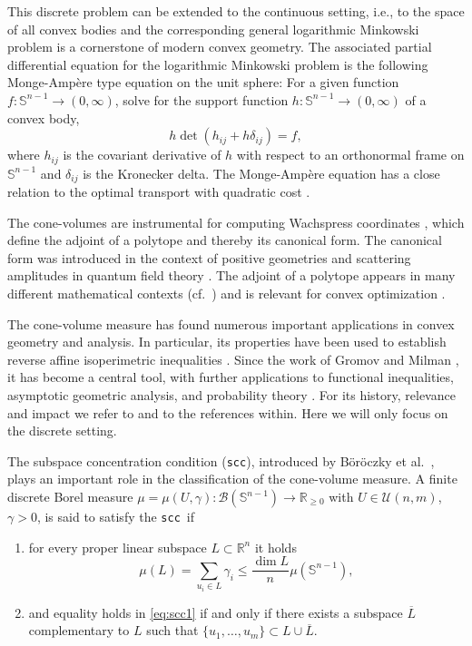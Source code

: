 \documentclass[11pt, a4paper, twoside, reqno]{amsart}
\newcommand{\R}{\mathbb{R}}
\theoremstyle{definition}
\theoremstyle{remark}
\newcommand{\sph}{\mathbb{S}}%
\newcommand{\scc}{{\tt scc}}
\newcommand{\ov}{\overline}
\numberwithin{equation}{section}
\begin{document}
This discrete problem can be extended to the continuous setting, i.e., to the space of all convex bodies and  
the corresponding general logarithmic Minkowski problem is a cornerstone of modern convex geometry. 
The associated partial differential equation for the logarithmic Minkowski problem is the following Monge-Ampère type equation on the unit sphere: For a given function $f: \sph^{n-1} \rightarrow (0,\infty)$, solve for the support function $h: \sph^{n-1} \rightarrow (0,\infty)$ of a convex body,
\begin{equation*}
    h \det(h_{ij} + h \delta_{ij}) = f,
\end{equation*}
where $h_{ij}$ is the covariant derivative of $h$ with respect to an orthonormal frame on $\sph^{n-1}$ and $\delta_{ij}$ is the Kronecker delta. The Monge-Ampère equation has a close relation to the optimal transport with quadratic cost \cite{de2014monge}. 

The cone-volumes are instrumental for computing Wachspress coordinates \cite{ju2005geometric}, which define the adjoint of a polytope and thereby its canonical form. The canonical form was introduced in the context of positive geometries and scattering amplitudes in quantum field theory \cite{arkani2017positive}. The adjoint of a polytope appears in many different mathematical contexts (cf.~\cite{kohn2020projective}) and is relevant for convex optimization \cite{Dmitrii2025}.

The cone-volume measure has found numerous important applications in convex geometry and analysis.
In particular, its properties have been used to establish reverse affine isoperimetric inequalities 
\cite{HE200673,XIONG20103214}. Since the work of Gromov and Milman 
\cite{CM_1987__62_3_263_0}, it has become a central tool, with further 
applications to functional inequalities, asymptotic geometric analysis, and probability theory 
\cite{accb6532790c46f8b15a8d2da8ff473f,Grigorios2009,Barthe2005}.
For its history, relevance and impact we refer to \cite{HuangYangZhang2025, BoeroeczkyLutwakYangEtAl2025, Stancu2016, BoeroeczkyHenk2016a, LiuSunXiong2021, Zhu2014, Boeroeczky2023, BoeroeczkyHegedusZhu2016, ChenLiZhu2019} and to the references within. 
Here we will only focus on the discrete setting. 

The subspace concentration condition (\scc), introduced by Böröczky et al.~\cite{BoeroeczkyLutwakYangEtAl2025}, plays an important role in the classification of the cone-volume measure.   A finite  discrete Borel measure $\mu=\mu(U,\gamma): \mathcal{B}(\sph^{n-1})\to\R_{\geq 0}$ with $U\in\mathcal{U}(n,m)$, $\gamma >0$, is said to satisfy the \scc\, if
\begin{enumerate}
\item for every proper linear subspace $L\subset\R^n$ it holds 
\begin{equation}
           \mu(L)=  \sum_{u_i\in L} \gamma_i \leq \frac{\dim L}{n}\mu(\sph^{n-1}),
 \label{eq:scc1} 
  \end{equation}
\item   and equality holds in \eqref{eq:scc1} if and only if there exists a subspace $\ov L$ complementary to  $L$ such that $\{u_1,\dots,u_m\}\subset L\cup\ov L$.   
\end{enumerate}   
\end{document}
